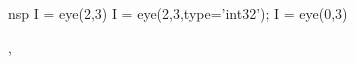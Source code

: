 \begin{examples}
\begin{mintednsp}{nsp}
I = eye(2,3) 
I = eye(2,3,type='int32');
I = eye(0,3)
\end{mintednsp} 

\end{examples}

\begin{manseealso}
, 
\end{manseealso}

